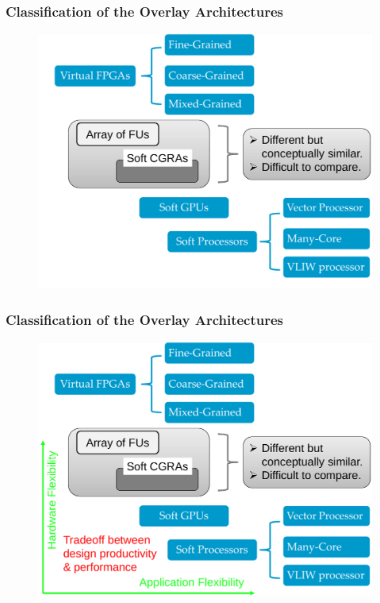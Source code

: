 \documentclass[accentcolor=tud1a,colorbacktitle,inverttitle,landscape,german,presentation,t]{tudbeamer}
\begin{document}
   \begin{frame}
   \frametitle{Classification of the Overlay Architectures}
   \vspace{-1em}
   \begin{figure}
      \includegraphics[width=.75\linewidth]{overlay-classification1}
   \end{figure}
   \end{frame}

   \begin{frame}
   \vspace{-1em}
   \frametitle{Classification of the Overlay Architectures}
   \begin{figure}
      \includegraphics[width=.75\linewidth]{overlay-classification2}
   \end{figure}
   \end{frame}
\end{document}
